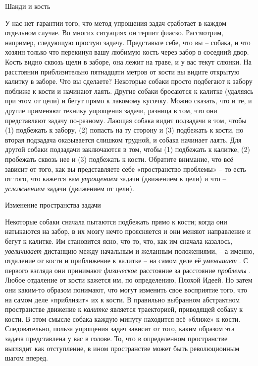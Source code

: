 \documentclass[../main.tex]{subfiles}
\begin{document}
Шанди и кость

У нас нет гарантии того, что метод упрощения задач сработает в каждом отдельном случае. Во многих ситуациях он терпит фиаско. Рассмотрим, например, следующую простую задачу. Представьте себе, что вы \--- собака, и что хозяин только что перекинул вашу любимую кость через забор в соседний двор. Кость видно сквозь щели в заборе, она лежит на траве, и у вас текут слюнки. На расстоянии приблизительно пятнадцати метров от кости вы видите открытую калитку в заборе. Что вы сделаете? Некоторые собаки просто подбегают к забору поближе к кости и начинают лаять. Другие собаки бросаются к калитке (удаляясь при этом от цели) и бегут прямо к лакомому кусочку. Можно сказать, что и те, и другие применяют технику упрощения задачи, разница в том, что они представляют задачу по-разному. Лающая собака видит подзадачи в том, чтобы (1) подбежать к забору, (2) попасть на ту сторону и (3) подбежать к кости, но вторая подзадача оказывается слишком трудной, и собака начинает лаять. Для другой собаки подзадачи заключаются в том, чтобы (1) подбежать к калитке, (2) пробежать сквозь нее и (3) подбежать к кости. Обратите внимание, что всё зависит от того, как вы представляете себе «пространство проблемы» \--- то есть от того, что кажется вам \emph{упрощением} задачи (движением к цели) и что \--- \emph{усложнением} задачи (движением от цели).

Изменение пространства задачи

Некоторые собаки сначала пытаются подбежать прямо к кости; когда они натыкаются на забор, в их мозгу нечто проясняется и они меняют направление и бегут к калитке. Им становится ясно, что то, что, как им сначала казалось, \emph{увеличивает} дистанцию между начальным и желанным положениями, \--- а именно, отдаление от кости и приближение к калитке \--- на самом деле её \emph{уменьшает} . С первого взгляда они принимают \emph{физическое} расстояние за расстояние \emph{проблемы} . Любое отдаление от кости кажется им, по определению, Плохой Идеей. Но затем они каким-то образом понимают, что могут изменить свое восприятие того, что на самом деле «приблизит» их к кости. В правильно выбранном абстрактном пространстве движение к \emph{калитке} является траекторией, приводящей собаку к кости. В этом смысле собака каждую минуту находится всё «ближе» к кости. Следовательно, польза упрощения задач зависит от того, каким образом эта задача представлена у вас в голове. То, что в определенном пространстве выглядит как отступление, в ином пространстве может быть революционным шагом вперед.
\end{document}
